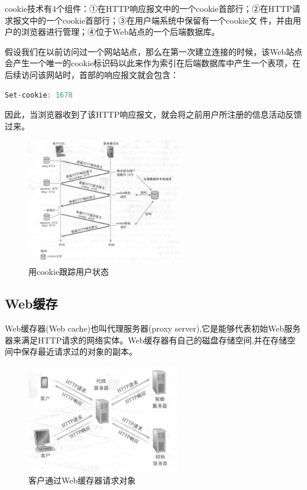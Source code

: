     cookie技术有4个组件：①在HTTP响应报文中的一个cookie首部行；②在HTTP请求报文中的一个cookie首部行；③在用户端系统中保留有一个cookie文 件，并由用户的浏览器进行管理；④位于Web站点的一个后端数据库。

    假设我们在以前访问过一个网站站点，那么在第一次建立连接的时候，该Web站点会产生一个唯一的cookie标识码以此来作为索引在后端数据库中产生一个表项，在后续访问该网站时，首部的响应报文就会包含：

\begin{lstlisting}[language=C++]
Set-cookie: 1678
\end{lstlisting}

    因此，当浏览器收到了该HTTP响应报文，就会将之前用户所注册的信息活动反馈过来。

\begin{figure}[!htbp]
    \centering
    \includegraphics[width=0.6\textwidth]{image/chapter02/cookie.png}
    \caption{用cookie跟踪用户状态}
\end{figure}

\subsection{Web缓存}

    Web缓存器(Web cache)也叫代理服务器(proxy server),它是能够代表初始Web服务器来满足HTTP请求的网络实体。Web缓存器有自己的磁盘存储空间,并在存储空间中保存最近请求过的对象的副本。

\begin{figure}[!htbp]
    \centering
    \includegraphics[width=0.6\textwidth]{image/chapter02/Web缓存技术.png}
    \caption{客户通过Web缓存器请求对象}
\end{figure}

